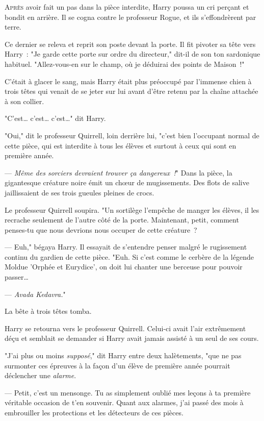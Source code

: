 
\lettrine{A}{près} avoir fait un pas dans la pièce interdite, Harry poussa un cri perçant et bondit en arrière. Il se cogna contre le professeur Rogue, et ils s'effondrèrent par terre.

Ce dernier se releva et reprit son poste devant la porte. Il fit pivoter sa tête vers Harry~: "Je garde cette porte sur ordre du directeur," dit-il de son ton sardonique habituel. "Allez-vous-en sur le champ, où je déduirai des points de Maison~!"

C'était à glacer le sang, mais Harry était plus préoccupé par l'immense chien à trois têtes qui venait de se jeter sur lui avant d'être retenu par la chaîne attachée à son collier.

"C'est… c'est… c'est…" dit Harry.

"Oui," dit le professeur Quirrell, loin derrière lui, "c'est bien l'occupant normal de cette pièce, qui est interdite à tous les élèves et surtout à ceux qui sont en première année.

--- \emph{Même des sorciers devraient trouver ça dangereux~!}" Dans la pièce, la gigantesque créature noire émit un chœur de mugissements. Des flots de salive jaillissaient de ses trois gueules pleines de crocs.

Le professeur Quirrell soupira. "Un sortilège l'empêche de manger les élèves, il les recrache seulement de l'autre côté de la porte. Maintenant, petit, comment penses-tu que nous devrions nous occuper de cette créature~?

--- Euh," bégaya Harry. Il essayait de s'entendre penser malgré le rugissement continu du gardien de cette pièce. "Euh. Si c'est comme le cerbère de la légende Moldue 'Orphée et Eurydice', on doit lui chanter une berceuse pour pouvoir passer…

--- \emph{Avada Kedavra.}"

La bête à trois têtes tomba.

Harry se retourna vers le professeur Quirrell. Celui-ci avait l'air extrêmement déçu et semblait se demander si Harry avait jamais assisté à un seul de ses cours.

"J'ai plus ou moins \emph{supposé}," dit Harry entre deux halètements, "que ne pas surmonter ces épreuves à la façon d'un élève de première année pourrait déclencher une \emph{alarme}.

--- Petit, c'est un mensonge. Tu as simplement oublié mes leçons à ta première véritable occasion de t'en souvenir. Quant aux alarmes, j'ai passé des mois à embrouiller les protections et les détecteurs de ces pièces.

